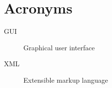 
\chapter{Acronyms}
\begin{description}
	\item[GUI] Graphical user interface
	\item[XML] Extensible markup language
\end{description}